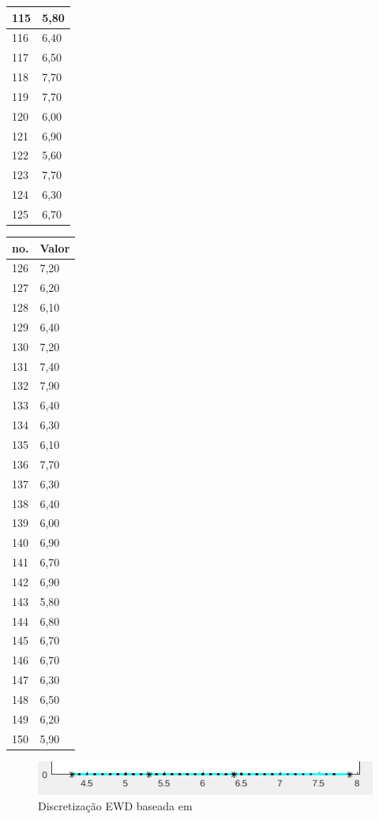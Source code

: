 \begin{table}[!ht]
\begin{tabular}{ |ll| }
115	&	5,80	\\ \hline
116	&	6,40	\\ \hline
117	&	6,50	\\ \hline
118	&	7,70	\\ \hline
119	&	7,70	\\ \hline
120	&	6,00	\\ \hline
121	&	6,90	\\ \hline
122	&	5,60	\\ \hline
123	&	7,70	\\ \hline
124	&	6,30	\\ \hline
125	&	6,70	\\ \hline
\end{tabular}
\begin{tabular}{ |ll| }
\hline
 no. & Valor \\ \hline
126	&	7,20	\\ \hline
127	&	6,20	\\ \hline
128	&	6,10	\\ \hline
129	&	6,40	\\ \hline
130	&	7,20	\\ \hline
131	&	7,40	\\ \hline
132	&	7,90	\\ \hline
133	&	6,40	\\ \hline
134	&	6,30	\\ \hline
135	&	6,10	\\ \hline
136	&	7,70	\\ \hline
137	&	6,30	\\ \hline
138	&	6,40	\\ \hline
139	&	6,00	\\ \hline
140	&	6,90	\\ \hline
141	&	6,70	\\ \hline
142	&	6,90	\\ \hline
143	&	5,80	\\ \hline
144	&	6,80	\\ \hline
145	&	6,70	\\ \hline
146	&	6,70	\\ \hline
147	&	6,30	\\ \hline
148	&	6,50	\\ \hline
149	&	6,20	\\ \hline
150	&	5,90	\\ \hline

\end{tabular}
\end{table}

\begin{figure}[h] 
        \centering
        \includegraphics[scale=0.9]{figs/efd_fisheriris_col1.png}
        \caption[Discretização EWD]{Discretização EWD baseada em \cite{LOPES2014}}%
        \label{fig:faixasEWD}
\end{figure}

